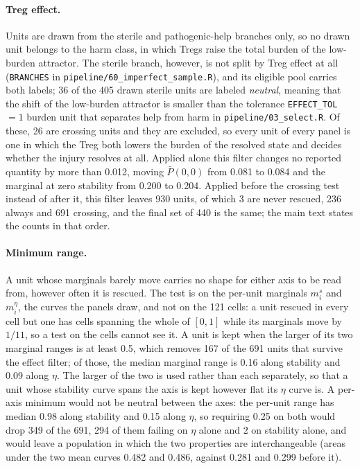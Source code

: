 \documentclass[11pt]{article}
\begin{document}
\paragraph{Treg effect.}
Units are drawn from the sterile and pathogenic-help branches only, so no drawn
unit belongs to the harm class, in which Tregs raise the total burden of the
low-burden attractor. The sterile branch, however, is not split by Treg effect
at all (\texttt{BRANCHES} in \texttt{pipeline/60\_imperfect\_sample.R}), and its
eligible pool carries both labels; 36 of the 405 drawn sterile units are
labeled \emph{neutral}, meaning that the shift of the low-burden attractor is
smaller than the tolerance \texttt{EFFECT\_TOL} $= 1$ burden unit that
separates help from harm in \texttt{pipeline/03\_select.R}. Of these, 26 are
crossing units and they are excluded, so every unit of every panel is one in
which the Treg both lowers the burden of the resolved state and decides whether
the injury resolves at all. Applied alone this filter changes no reported
quantity by more than 0.012, moving $\bar P(0,0)$ from 0.081 to 0.084 and the
marginal at zero stability from 0.200 to 0.204. Applied before the crossing test instead of after it, this filter leaves 930 units,
of which 3 are never rescued, 236 always and 691 crossing, and the final set of 440
is the same; the main text states the counts in that order.

\paragraph{Minimum range.}
A unit whose marginals barely move carries no shape for either axis to be read
from, however often it is rescued. The test is on the per-unit marginals
$m^s_i$ and $m^\eta_i$, the curves the panels draw, and not on the 121 cells: a
unit rescued in every cell but one has cells spanning the whole of $[0,1]$ while
its marginals move by $1/11$, so a test on the cells cannot see it. A unit is
kept when the larger of its two marginal ranges is at least 0.5, which removes
167 of the 691 units that survive the effect filter; of those, the median
marginal range is 0.16 along stability and 0.09 along $\eta$. The larger of the
two is used rather than each separately, so that a unit whose stability curve
spans the axis is kept however flat its $\eta$ curve is. A per-axis minimum
would not be neutral between the axes: the per-unit range has median 0.98 along
stability and 0.15 along $\eta$, so requiring 0.25 on both would drop 349 of the
691, 294 of them failing on $\eta$ alone and 2 on stability alone, and would
leave a population in which the two properties are interchangeable (areas under
the two mean curves 0.482 and 0.486, against 0.281 and 0.299 before it).
\end{document}
